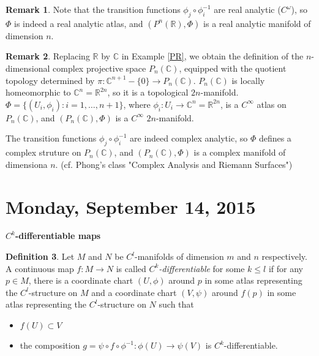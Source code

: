 \documentclass{amsart}
\numberwithin{equation}{section}
\newcommand{\bC}{\mathbb{C}}
\newcommand{\bR}{\mathbb{R}}
\theoremstyle{definition}
\newtheorem{definition}{Definition} [section]
\newtheorem{remark}[definition]{Remark}
\theoremstyle{theorem}
\begin{document}
\begin{remark}
Note that the transition functions $\phi_j\circ \phi_i^{-1}$ are real
analytic ($C^\omega$), so $\Phi$ is indeed a real analytic atlas, and
$(P^n(\bR),\Phi)$ is a real analytic manifold of dimension $n$.
\end{remark}

\begin{remark}
Replacing $\bR$ by $\bC$ in Example \ref{PR}, we obtain the
definition of the $n$-dimensional complex projective space $P_n(\bC)$, equipped
with the quotient topology determined by $\pi:\bC^{n+1}-\{0\}\to P_n(\bC)$.
$P_n(\bC)$ is locally homeomorphic to $\bC^n=\bR^{2n}$, so it is 
a topological $2n$-manifold. $\Phi=\{(U_i,\phi_i): i=1,\ldots, n+1\}$,
where $\phi_i:U_i\to \bC^n=\bR^{2n}$, is a $C^\infty$ atlas on $P_n(\bC)$,
and $(P_n(\bC), \Phi)$ is a $C^\infty$ $2n$-manifold. 

The transition functions $\phi_j\circ \phi_i^{-1}$ are indeed complex
analytic, so $\Phi$ defines a complex struture on $P_n(\bC)$,
and $(P_n(\bC),\Phi)$ is a complex manifold of dimensiona $n$. (cf. 
Phong's class "Complex Analysis and Riemann Surfaces")
\end{remark}




\section{Monday, September 14, 2015}

\noindent
{\bf \large $C^k$-differentiable maps}


\begin{definition}
Let $M$ and $N$ be $C^l$-manifolds of dimension $m$ and $n$ respectively. A continuous map $f : M \to N$ is called 
{\em $C^k$-differentiable} for some $k \le l$ if for any $p \in M$, there is a coordinate chart $(U,\phi)$ around $p$ in some atlas representing the $C^l$-structure on $M$ and a coordinate chart $(V,\psi)$ around $f(p)$ in some atlas representing the $C^l$-structure on $N$ such that 
\begin{itemize}
\item $f(U) \subset V$
\item the composition $g = \psi \circ f \circ \phi^{-1} : \phi(U) \to \psi(V)$ is $C^k$-differentiable. 
\end{itemize}
\end{definition}
\end{document}
